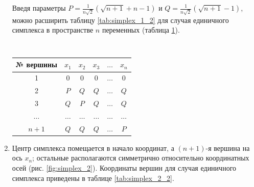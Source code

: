 \documentclass[a4paper,12pt]{report}
\begin{document}
\begin{enumerate}
Введя параметры $P = \frac{1}{n\sqrt{2}}(\sqrt{n+1} + n - 1)$ и $Q = \frac{1}{n\sqrt{2}}(\sqrt{n+1} - 1)$, можно расширить таблицу \ref{tab:simplex_1_2} для случая единичного симплекса в пространстве $n$ переменных (таблица \ref{tab:simplex_1_n}).

\begin{table}
\begin{center}
\captionsetup{justification=raggedleft}
\caption{\hspace{50mm}~}
\label{tab:simplex_1_n}
    \begin{tabular}{|c|c|c|c|c|c|}
      \hline
      № вершины & $x_{1}$ & $x_{2}$ & $x_{3}$ & $\ldots$ & $x_{n}$\\
      \hline
      1 & 0 & 0 & 0 & $\ldots$ & 0\\
      \hline
      2 & $P$ & $Q$ & $Q$ & $\ldots$ & $Q$\\
      \hline
      3 & $Q$ & $P$ & $Q$ & $\ldots$ & $Q$\\
      \hline
      $\ldots$ & $\ldots$ & $\ldots$ & $\ldots$ & $\ldots$ & $\ldots$\\
      \hline
      $n+1$ & $Q$ & $Q$ & $Q$ & $\ldots$ & $P$\\
      \hline
    \end{tabular}
\end{center}
\end{table}

\item Центр симплекса помещается в начало координат, а $(n+1)$-я вершина на ось $x_{n}$; остальные располагаются симметрично относительно координатных осей (рис. \ref{fig:simplex_2}). Координаты вершин для случая единичного симплекса приведены в таблице \ref{tab:simplex_2_2}.


\end{enumerate}
\end{document}
